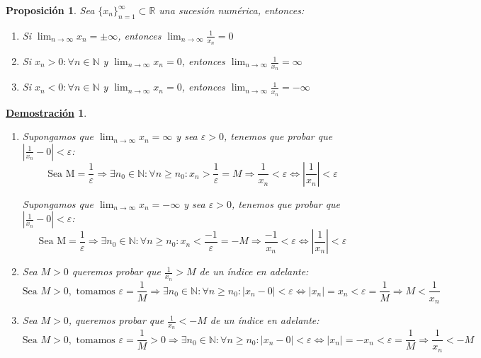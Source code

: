 \documentclass[10pt,a4paper,openright]{book}
\theoremstyle{break}
\newtheorem{prop}{Proposición}[chapter]
\newtheorem*{demo}{\underline{Demostración}}
\begin{document}
\begin{prop}
Sea $\{x_n\}_{n=1}^\infty \subset \mathbb R$ una sucesión numérica, entonces:
\begin{enumerate}
\item Si $\lim_{n\rightarrow \infty} x_n=\pm \infty$, entonces $\lim_{n\rightarrow \infty} \frac{1}{x_n}=0$

\item Si $x_n>0: \forall n\in \mathbb N$ y $\lim_{n\rightarrow \infty} x_n=0$, entonces $\lim_{n\rightarrow \infty} \frac{1}{x_n}=\infty$

\item Si $x_n<0: \forall n\in \mathbb N$ y $\lim_{n\rightarrow \infty}x_n=0$, entonces $\lim_{n\rightarrow \infty} \frac{1}{x_n}=-\infty$
\end{enumerate}
\end{prop}
\begin{demo}
\begin{enumerate}
\item Supongamos que $\lim_{n\rightarrow \infty} x_n=\infty$ y sea $\varepsilon>0$, tenemos que probar que $|\frac{1}{x_n}-0|<\varepsilon$:
$$\mbox{Sea M}=\frac{1}{\varepsilon}\Rightarrow \exists n_0\in \mathbb N: \forall n\geq n_0: x_n> \frac{1}{\varepsilon}=M\Rightarrow \frac{1}{x_n}<\varepsilon\Leftrightarrow |\frac{1}{x_n}|<\varepsilon$$

Supongamos que $\lim_{n\rightarrow \infty} x_n=-\infty$ y sea $\varepsilon>0$, tenemos que probar que $|\frac{1}{x_n}-0|<\varepsilon$:
$$\mbox{Sea M}=\frac{1}{\varepsilon}\Rightarrow \exists n_0\in \mathbb N: \forall n\geq n_0: x_n< \frac{-1}{\varepsilon}=-M\Rightarrow \frac{-1}{x_n}<\varepsilon\Leftrightarrow |\frac{1}{x_n}|<\varepsilon$$

\item Sea $M>0$ queremos probar que $\frac{1}{x_n}>M$ de un índice en adelante:
$$\mbox{Sea }M>0,\mbox{ tomamos } \varepsilon=\frac{1}{M}\Rightarrow \exists n_0\in \mathbb N: \forall n\geq n_0: |x_n-0|<\varepsilon\Leftrightarrow |x_n|=x_n<\varepsilon=\frac{1}{M}\Rightarrow M<\frac{1}{x_n}$$

\item Sea $M>0$, queremos probar que $\frac{1}{x_n}<-M$ de un índice en adelante:
$$\mbox{Sea }M>0,\mbox{ tomamos }\varepsilon=\frac{1}{M}>0\Rightarrow \exists n_0\in \mathbb N: \forall n\geq n_0: |x_n-0|<\varepsilon\Leftrightarrow |x_n|=-x_n<\varepsilon=\frac{1}{M}\Rightarrow \frac{1}{x_n}<-M$$
\end{enumerate}
\end{demo}
\end{document}
